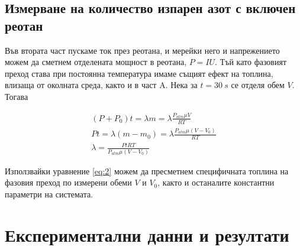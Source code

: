 \documentclass[%
 reprint,
 amsmath,amssymb,
 aps,
]{revtex4-2}
\begin{document}
\subsection{Измерване на количество изпарен азот с включен реотан}
Във втората част пускаме ток през реотана, и мерейки него и напрежението можем да сметнем отделената мощност в реотана, $P = IU$. Тъй като фазовият преход става при постоянна температура имаме същият ефект на топлина, влизаща от околната среда, както и в част A. Нека за $t=30 \ \si{s}$ се отделя обем $V$. Тогава 

\begin{gather*}
    (P + P_0) t = \lambda m = \lambda \frac{P_{atm}\mu V}{RT} \\
    P t = \lambda (m - m_0) = \lambda \frac{P_{atm}\mu (V - V_0)}{RT} \\
    \lambda = \frac{PtRT}{P_{atm}\mu(V - V_0)} \label{eq:2} \tag{2}
\end{gather*}

Използвайки уравнение \eqref{eq:2} можем да пресметнем специфичната топлина на фазовия преход по измерени обеми $V$ и $V_0$, както и останалите константни параметри на системата.
\section{Експериментални данни и резултати}
\end{document}
